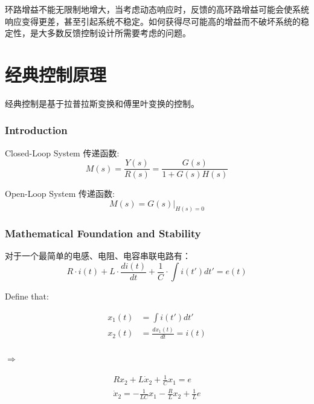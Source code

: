 \documentclass[main.tex]{subfiles}
\begin{document}
环路增益不能无限制地增大，当考虑动态响应时，反馈的高环路增益可能会使系统响应变得更差，甚至引起系统不稳定。如何获得尽可能高的增益而不破坏系统的稳定性，是大多数反馈控制设计所需要考虑的问题。

\section{经典控制原理}
经典控制是基于拉普拉斯变换和傅里叶变换的控制。
\subsubsection{Introduction}
Closed-Loop System 传递函数: 
\begin{equation}
    M(s) = \frac{Y(s)}{R(s)} = \frac{G(s)}{1+G(s)H(s)}
\end{equation}

Open-Loop System 传递函数:
\begin{equation}
    M(s) = G(s)|_{H(s)=0}
\end{equation}

\subsubsection{Mathematical Foundation and Stability}

对于一个最简单的电感、电阻、电容串联电路有：
\begin{equation}
    R\cdot i(t) + L\cdot \frac{di(t)}{dt}+\frac{1}{C}\cdot\int i(t')dt' = e(t)
\end{equation}

Define that:

\begin{equation}
    \begin{aligned}
        x_1(t) &= \int i(t')dt' \\
        x_2(t) &= \frac{dx_1(t)}{dt} = i(t) \\
    \end{aligned}
\end{equation}

$\Longrightarrow$

\begin{equation}
    \begin{aligned}
        Rx_2 + L\dot x_2 + \frac{1}{C}x_1 = e \\
        \dot x_2 = -\frac{1}{LC}x_1 - \frac{R}{L}x_2+\frac{1}{L}e \\
    \end{aligned}
\end{equation}
\end{document}
